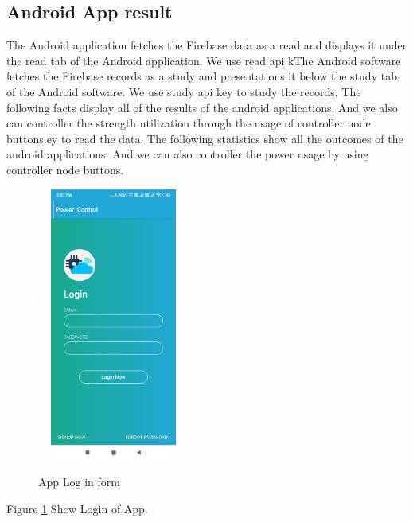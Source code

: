 \documentclass[12pt,a4paper]{article}
\begin{document}
\subsection{Android App result}
\hspace{0.5cm}The Android application fetches the Firebase data as a read and displays it under the read tab of the Android application. We use read api kThe Android software fetches the Firebase records as a study and presentations it below the study tab of the Android software. We use study api key to study the records. The following facts display all of the results of the android applications. And we also can controller the strength utilization through the usage of controller node buttons.ey to read the data. The following statistics show all the outcomes of the android applications. And we can also controller the power usage by using controller node buttons.\\

\begin{figure}[H]
	\centering
	\includegraphics[width=5cm, height=9cm]{appi2.jpg}\\
	\caption{App Log in form }
	\label{fig:6.2.1}
\end{figure}
\begin{center}
Figure \ref{fig:6.2.1} Show Login of App.
\end{center}
\end{document}

